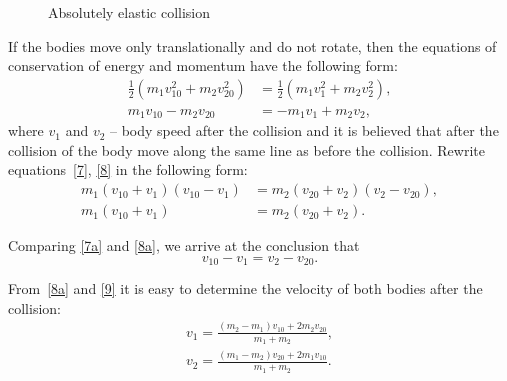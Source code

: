\documentclass{LabWorkEng}
\begin{document}
\begin{figure}\centering
	\begin{picbox}	
	\end{picbox}	
	\caption{Absolutely elastic collision}
	\label{elcoll}
\end{figure}

If the bodies move only translationally and do not rotate, then the equations of conservation of energy and momentum have the following form:
\begin{align}
	\frac{1}{2}\left( {{m_1}v_{10}^2 + {m_2}v_{20}^2} \right) &= \frac{1}{2}\left( {{m_1}v_1^2 + {m_2}v_2^2} \right), \label{7}\\
	{m_1}{v_{10}} - {m_2}{v_{20}} &=  - {m_1}{v_1} + {m_2}{v_2},\label{8}
\end{align}
where $v_1$ and $v_2$ -- body speed after the collision and it is believed that after the collision of the body move along the same line as before the collision. Rewrite equations~\eqref{7}, \eqref{8} in the following form:
\begin{align}
{m_1}\left( {{v_{10}} + {v_1}} \right)\left( {{v_{10}} - {v_1}} \right) &= {m_2}\left( {{v_{20}} + {v_2}} \right)\left( {{v_2} - {v_{20}}} \right) ,\label{7a}\\
{m_1}\left( {{v_{10}} + {v_1}} \right) &= {m_2}\left( {{v_{20}} + {v_2}} \right).\label{8a}
\end{align}

Comparing \eqref{7a} and \eqref{8a}, we arrive at the conclusion that
\begin{equation}\label{9}
	v_{10} - v_1 = v_2 - v_{20}.
\end{equation}

From~\eqref{8a} and \eqref{9} it is easy to determine the velocity of both bodies after the collision:
\begin{align}
	v_1 = \frac{\left( {{m_2} - {m_1}} \right){v_{10}} + 2m_2v_{20}}{m_1 + m_2}, \label{10} \\
	v_2 = \frac{\left( {m_1 - m_2} \right){v_{20}} + 2m_1v_{10}}{m_1 + m_2}. \label{10a}	
\end{align}
\end{document}
